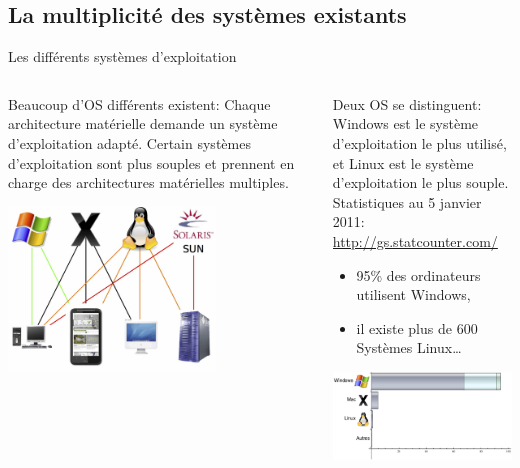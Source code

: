\subsection{La multiplicité des systèmes existants}
\begin{frame}{Les différents systèmes d'exploitation}
  \begin{columns}
    \begin{column}{5.5cm}
      \begin{block}{Beaucoup d'OS différents existent:}
        Chaque architecture matérielle  demande un système d'exploitation adapté. Certain systèmes d'exploitation sont plus souples et prennent en charge des architectures matérielles multiples.
      \end{block}
      \begin{center}
        \includegraphics[width=5.5cm]{img/s01/OS_archi.jpg}
      \end{center}
    \end{column}
    \begin{column}{5.5cm}
      \begin{block}{Deux OS se distinguent:}
        Windows est le système d'exploitation le plus utilisé, et Linux est le système d'exploitation le plus souple.\\
        Statistiques au 5 janvier 2011: \url{http://gs.statcounter.com/}\\
        \begin{itemize}
        \item 95\% des ordinateurs utilisent Windows,
        \item il existe plus de 600 Systèmes Linux\dots
        \end{itemize}
      \end{block}
      \vrule
      \begin{center}
        \includegraphics[width=5.5cm]{img/s01/OS_utilises.jpg}
      \end{center}
    \end{column}
  \end{columns}
\end{frame}
